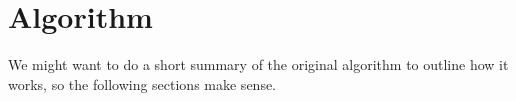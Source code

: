 \section{Algorithm}
We might want to do a short summary of the original algorithm to outline how it works, so the following sections make sense.
